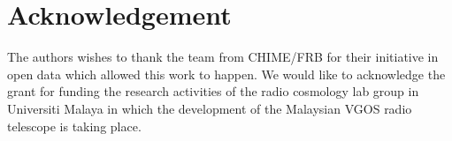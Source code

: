 \documentclass[reprint,amsmath,amssymb,showkeys,prd]{revtex4-2}
\begin{document}
\section{Acknowledgement}

The authors wishes to thank the team from CHIME/FRB for their initiative in open data which allowed this work to happen.
We would like to acknowledge the grant
for funding the research activities of the radio cosmology lab group in Universiti Malaya in which the development of the Malaysian VGOS radio telescope is taking place.



\end{document}
